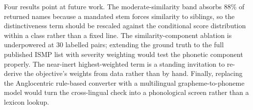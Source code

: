 \documentclass[conference]{IEEEtran}
\begin{document}
Four results point at future work. The moderate-similarity band absorbs 88\% of
returned names because a mandated stem forces similarity to siblings, so the
distinctiveness term should be rescaled against the conditional score
distribution within a class rather than a fixed line. The similarity-component
ablation is underpowered at 30 labelled pairs; extending the ground truth to the
full published ISMP list with severity weighting would test the phonetic
component properly. The near-inert highest-weighted term is a standing
invitation to re-derive the objective's weights from data rather than by hand.
Finally, replacing the Anglocentric rule-based converter with a multilingual
grapheme-to-phoneme model would turn the cross-lingual check into a phonological
screen rather than a lexicon lookup.

\end{document}
